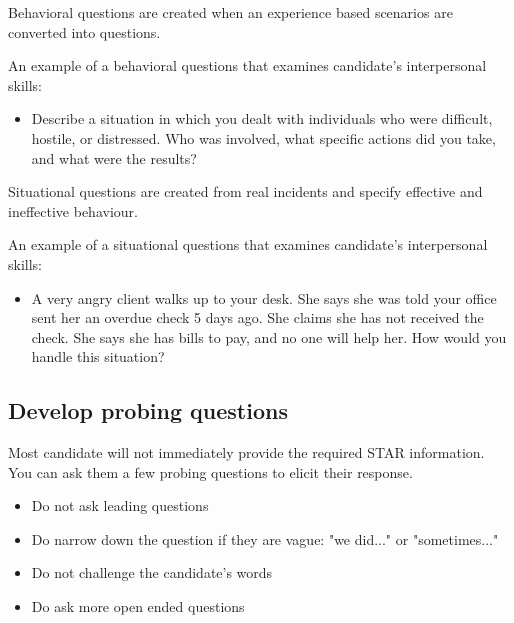 \documentclass{article}
\begin{document}
Behavioral questions are created when an experience based scenarios are converted into questions.

An example of a behavioral questions that examines candidate's interpersonal skills:
\begin{itemize}
  \item Describe a situation in which you dealt with individuals who were difficult, hostile, or distressed. Who was involved, what specific actions did you take, and what were the results?
\end{itemize}

Situational questions are created from real incidents and specify effective and ineffective behaviour.

An example of a situational questions that examines candidate's interpersonal skills:
\begin{itemize}
  \item A very angry client walks up to your desk. She says she was told your office sent her an overdue check 5 days ago. She claims she has not received the check. She says she has bills to pay, and no one will help her. How would you handle this situation?
\end{itemize}


\subsection{Develop probing questions}

Most candidate will not immediately provide the required STAR information. You can ask them a few probing questions to elicit their response.

\begin{itemize}
  \item Do not ask leading questions
  \item Do narrow down the question if they are vague: "we did..." or "sometimes..."
  \item Do not challenge the candidate's words
  \item Do ask more open ended questions
\end{itemize}
\end{document}
